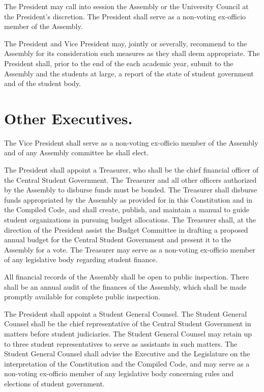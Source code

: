     The President may call into session the Assembly or the University Council at the President's discretion. The President shall serve as a non-voting ex-officio member of the Assembly.

    The President and Vice President may, jointly or severally, recommend to the Assembly for its consideration such measures as they shall deem appropriate. The President shall, prior to the end of the each academic year, submit to the Assembly and the students at large, a report of the state of student government and of the student body.


\section{Other Executives.}
    The Vice President shall serve as a non-voting ex-officio member of the Assembly and of any Assembly committee he shall elect.

   The President shall appoint a Treasurer, who shall be the chief financial officer of the Central Student Government. The Treasurer and all other officers authorized by the Assembly to disburse funds must be bonded. The Treasurer shall disburse funds appropriated by the Assembly as provided for in this Constitution and in the Compiled Code, and shall create, publish, and maintain a manual to guide student organizations in pursuing budget allocations. The Treasurer shall, at the direction of the President assist the Budget Committee in drafting a proposed annual budget for the Central Student Government and present it to the Assembly for a vote. The Treasurer may serve as a non-voting ex-officio member of any legislative body regarding student finance.

    All financial records of the Assembly shall be open to public inspection. There shall be an annual audit of the finances of the Assembly, which shall be made promptly available for complete public inspection.

    The President shall appoint a Student General Counsel. The Student General Counsel shall be the chief representative of the Central Student Government in matters before student judiciaries. The Student General Counsel may retain up to three student representatives to serve as assistants in such matters. The Student General Counsel shall advise the Executive and the Legislature on the interpretation of the Constitution and the Compiled Code, and may serve as a non-voting ex-officio member of any legislative body concerning rules and elections of student government.
    
